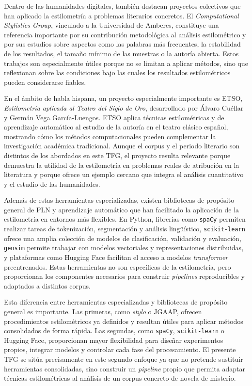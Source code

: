 \documentclass[IB]{TFUOC}%
\begin{document}
Dentro de las humanidades digitales, también destacan proyectos colectivos que han aplicado la estilometría a problemas literarios concretos. El \textit{Computational Stylistics Group}, vinculado a la Universidad de Amberes, constituye una referencia importante por su contribución metodológica al análisis estilométrico y por sus estudios sobre aspectos como las palabras más frecuentes, la estabilidad de los resultados, el tamaño mínimo de las muestras o la autoría abierta\cite{computationalstylistics2025}. Estos trabajos son especialmente útiles porque no se limitan a aplicar métodos, sino que reflexionan sobre las condiciones bajo las cuales los resultados estilométricos pueden considerarse fiables.

En el ámbito de habla hispana, un proyecto especialmente importante es ETSO, \textit{Estilometría aplicada al Teatro del Siglo de Oro}, desarrollado por Álvaro Cuéllar y Germán Vega García-Luengos\cite{gonzalez2017etso}. ETSO aplica técnicas estilométricas y de aprendizaje automático al estudio de la autoría en el teatro clásico español, mostrando cómo los métodos computacionales pueden complementar la investigación académica tradicional. Aunque el corpus y el periodo literario son distintos de los abordados en este TFG, el proyecto resulta relevante porque demuestra la utilidad de la estilometría en problemas reales de atribución en la literatura y porque ofrece un ejemplo cercano que integra el análisis cuantitativo y el estudio de las humanidades.

Además de estas herramientas especializadas, existen bibliotecas de propósito general de PLN y aprendizaje automático que han facilitado la aplicación de la estilometría en entornos más flexibles. En Python, librerías como \texttt{spaCy}\cite{spacy2026} permiten realizar tareas de tokenización, segmentación y análisis lingüístico, \texttt{scikit-learn}\cite{ScikitLearnWeb} ofrece una amplia colección de modelos de clasificación, validación y evaluación, \texttt{gensim}\cite{RehurekGensim} permite trabajar con modelos vectoriales y representaciones distribuidas, y plataformas como Hugging Face\cite{HuggingFacePlatform} facilitan el acceso a modelos \textit{transformer} preentrenados. Estas herramientas no son específicas de la estilometría, pero proporcionan los componentes necesarios para construir \textit{pipelines} reproducibles y adaptados a distintos corpus.

Esta diferencia entre herramientas especializadas y bibliotecas de propósito general es importante. Las primeras, como \textit{stylo} o JGAAP, ofrecen procedimientos estilométricos ya definidos y resultan útiles para aplicar métodos consolidados de forma rápida. Las segundas, como \texttt{spaCy}, \texttt{scikit-learn} o Hugging Face, proporcionan mayor flexibilidad para diseñar experimentos propios, integrar modelos y controlar cada fase del procesamiento. El presente TFG se sitúa precisamente en este segundo enfoque ya que no pretende sustituir herramientas consolidadas, sino construir un \textit{pipeline} propio que permita adaptar técnicas estilométricas al análisis de un corpus concreto de novela de misterio.
\end{document}
